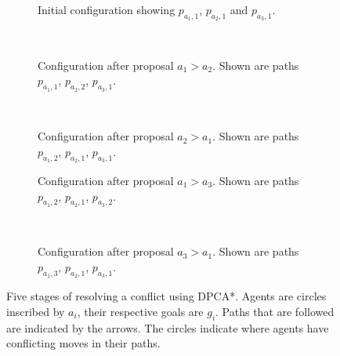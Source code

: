 \begin{figure}[t]
    \centering
    \begin{subfigure}[t]{.3\textwidth}
        \centering
        \def\svgscale{.6}
        
        \caption{Initial configuration showing $p_{a_1,1}$, $p_{a_2,1}$ and 
            $p_{a_3,1}$.}
        \label{fig:example-initial}
    \end{subfigure}
    ~
    \begin{subfigure}[t]{.3\textwidth}
        \centering
        \def\svgscale{.6}
        
        \caption{Configuration after proposal $a_1 > a_2$. Shown are paths 
        $p_{a_1,1}$, $p_{a_2,2}$, $p_{a_3,1}$.}
        \label{fig:example2}
    \end{subfigure}
    ~
    \begin{subfigure}[t]{.3\textwidth}
        \centering
        \def\svgscale{.6}
        
        \caption{Configuration after proposal $a_2 > a_1$. Shown are paths 
        $p_{a_1,2}$, $p_{a_2,1}$, $p_{a_3,1}$.}
        \label{fig:example3}
    \end{subfigure}
    
    \begin{subfigure}[t]{.45\textwidth}
        \centering
        \def\svgscale{.6}
        
        \caption{Configuration after proposal $a_1 > a_3$. Shown are paths 
        $p_{a_1,2}$, $p_{a_2,1}$, $p_{a_3,2}$.}
        \label{fig:example4}
    \end{subfigure}
    ~
    \begin{subfigure}[t]{.45\textwidth}
        \centering
        \def\svgscale{.6}
        
        \caption{Configuration after proposal $a_3 > a_1$. Shown are paths 
        $p_{a_1,3}$, $p_{a_2,1}$, $p_{a_3,1}$.}
        \label{fig:example5}
    \end{subfigure}
    
    \caption{Five stages of resolving a conflict using DPCA*. Agents are 
    circles inscribed
        by $a_i$, their respective goals are $g_i$. Paths that are followed are
        indicated by the arrows. The circles indicate where agents have 
        conflicting moves in their paths.}
    \label{fig:example}
\end{figure}

